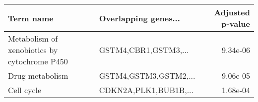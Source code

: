 \begin{tabular}{llr}
\toprule
                                   Term name &  Overlapping genes... &  Adjusted p-value \\
\midrule
Metabolism of xenobiotics by cytochrome P450 &  GSTM4,CBR1,GSTM3,... &          9.34e-06 \\
                             Drug metabolism & GSTM4,GSTM3,GSTM2,... &          9.06e-05 \\
                                  Cell cycle & CDKN2A,PLK1,BUB1B,... &          1.68e-04 \\
\bottomrule
\end{tabular}

